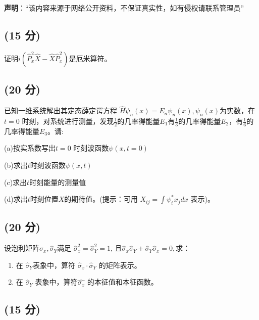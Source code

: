 
\textbf{声明}：“该内容来源于网络公开资料，不保证真实性，如有侵权请联系管理员”

\subsection{(15 分)}
证明$i\left(\hat{P}_x^2\hat{X} - \hat{X}\hat{P}_x^2\right)$是厄米算符。
\subsection{(20 分)}
已知一维系统解出其定态薛定谔方程 $\hat{H} \psi_n(x) = E_n \psi_n(x), \psi_n(x)$为实数，在 $t=0$ 时刻，对系统进行测量，发现$\frac{1}{2}$的几率得能量$E_1$有$\frac{1}{3}$的几率得能量$E_2$，有$\frac{1}{6}$的几率得能量$E_3$。请:

(a)按实系数写出$t=0$ 时刻波函数$\psi(x, t=0)$

(b)求出$t$时刻波函数$\psi(x, t)$

(c)求出$t$时刻能量的测量值

(d)求出$t$时刻位置$X$的期待值。(提示：可用  $X_{ij} = \int \psi_i^* x_j dx$ 表示)。
\subsection{(20 分)}
设泡利矩阵$\hat{\sigma}_x, \hat{\sigma}_Y$满足 $\hat{\sigma}_x^2 = \hat{\sigma}_Y^2 = 1$, 且$\hat{\sigma}_x \hat{\sigma}_Y + \hat{\sigma}_Y \hat{\sigma}_x = 0,$求：

\begin{enumerate}
    \item 在 $\hat{\sigma}_Y $表象中，算符 $\hat{\sigma}_x \cdot \hat{\sigma}_Y$ 的矩阵表示。
    \item 在 $\hat{\sigma}_Y$  表象中，算符$\hat{\sigma_x }$ 的本征值和本征函数。
\end{enumerate}
\subsection{(15 分)}